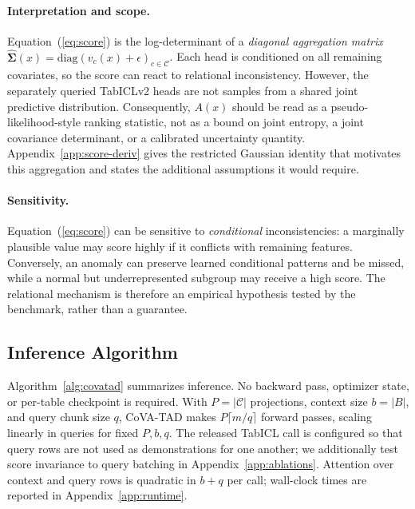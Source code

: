 \documentclass{article}
\begin{document}
\paragraph{Interpretation and scope.}
Equation~(\ref{eq:score}) is the log-determinant of a \emph{diagonal aggregation matrix} $\widehat{\boldsymbol{\Sigma}}(x)=\mathrm{diag}(v_c(x)+\epsilon)_{c\in\mathcal{C}}$. Each head is conditioned on all remaining covariates, so the score can react to relational inconsistency. However, the separately queried TabICLv2 heads are not samples from a shared joint predictive distribution. Consequently, $A(x)$ should be read as a pseudo-likelihood-style ranking statistic, not as a bound on joint entropy, a joint covariance determinant, or a calibrated uncertainty quantity. Appendix~\ref{app:score-deriv} gives the restricted Gaussian identity that motivates this aggregation and states the additional assumptions it would require.

\paragraph{Sensitivity.} Equation~(\ref{eq:score}) can be sensitive to \emph{conditional} inconsistencies: a marginally plausible value may score highly if it conflicts with remaining features. Conversely, an anomaly can preserve learned conditional patterns and be missed, while a normal but underrepresented subgroup may receive a high score. The relational mechanism is therefore an empirical hypothesis tested by the benchmark, rather than a guarantee.

\subsection{Inference Algorithm}
\label{subsec:algo}
Algorithm~\ref{alg:covatad} summarizes inference. No backward pass, optimizer state, or per-table checkpoint is required. With $P = |\mathcal{C}|$ projections, context size $b = |B|$, and query chunk size $q$, CoVA-TAD makes $P\lceil m/q \rceil$ forward passes, scaling linearly in queries for fixed $P, b, q$. The released TabICL call is configured so that query rows are not used as demonstrations for one another; we additionally test score invariance to query batching in Appendix~\ref{app:ablations}. Attention over context and query rows is quadratic in $b + q$ per call; wall-clock times are reported in Appendix~\ref{app:runtime}.
\end{document}
